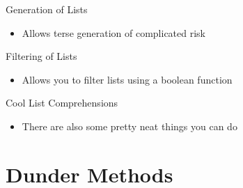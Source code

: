 \documentclass[aspectratio=169,xcolor=dvipsnames]{beamer}
\begin{document}

\begin{frame}{Generation of Lists}
  \begin{itemize}
    \item Allows terse generation of complicated risk
    \begin{example}
      
    \end{example}
  \end{itemize}
\end{frame}


\begin{frame}{Filtering of Lists}
  \begin{itemize}
    \item Allows you to filter lists using a boolean function
    \begin{example}
      
    \end{example}
  \end{itemize}
\end{frame}


\begin{frame}{Cool List Comprehensions}
  \begin{itemize}
    \item There are also some pretty neat things you can do
    \begin{example}
      
      
    \end{example}
  \end{itemize}
\end{frame}


\section{Dunder Methods}
\end{document}
